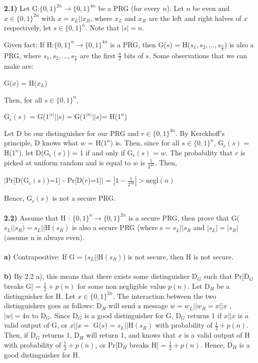 \documentclass[12pt]{article}
\begin{document}
\noindent \textbf{2.1)} Let G:$\{0,1\}^{2n} \rightarrow \{0,1\}^{4n}$ be a PRG (for every $n$). Let $n$ be even and $x \in \{0,1\}^{2n}$ with $x = x_L||x_R$, where $x_L$ and $x_R$ are the left and right halves of $x$ respectively, let $s \in \{0,1\}^n$. Note that $|s| = n$. 

\noindent Given fact: If H:$\{0,1\}^n \rightarrow \{0,1\}^{4n}$ is a PRG, then G($s$) = H($s_1, s_2,...,s_\frac{n}{2}$) is also a PRG, where $s_1, s_2,...,s_\frac{n}{2}$ are the first $\frac{n}{2}$ bits of $s$. Some observations that we can make are:
\begin{center}
G($x$) = H($x_L$)
\end{center}
\noindent Then, for all $s \in \{0,1\}^n$,
\begin{center}
G$_c(s)$ = G($1^{|s|}||s$) = G($1^{|n|}||s$)= H($1^n$)
\end{center}
\noindent Let D be our distinguisher for our PRG and $r \in \{0,1\}^{4n}$. By Kerckhoff's principle, D knows what $w$ = H($1^n$) is. Then, since for all $s \in \{0,1\}^n$, G$_c(s)$ = H($1^n$), let D(G$_c(s)$) = 1 if and only if G$_c(s)$ = $w$. The probability that $r$ is picked at uniform random and is equal to $w$ is $\frac{1}{2^{4n}}$. Then,
\begin{center}
$|$Pr[D(G$_c(s)$)=1] - Pr[D($r$)=1]$|$ = $|1 - \frac{1}{2^{4n}}| >$negl$(n)$
\end{center}
Hence, G$_c(s)$ is not a secure PRG.
\\
\\
\noindent \textbf{2.2)}  Assume that H : $\{0, 1\}^n \rightarrow \{0, 1\}^{2n}$ is a secure PRG, then prove that G($s_L||s_R) =
s_L||$H$(s_R)$ is also a secure PRG (where s = $s_L||s_R$ and $|s_L| = |s_R|$ (assume n is always even).
\\
\\
\noindent \textbf{a)} Contrapositive: If G = ($s_L || $H$(s_R)$) is not secure, then H is not secure.
\\
\\
\noindent \textbf{b)} By 2.2 a), this means that there exists some distinguisher D$_G$ such that Pr[D$_G$ breaks G] = $\frac{1}{2} + p(n)$ for some non negligible value $p(n)$. Let D$_H$ be a distinguisher for H. Let $x \in \{0, 1\}^{2n}$. The interaction between the two distinguishers goes as follows: D$_H$ will send a message $w = w_L||w_R = x||x$ , $|w| = 4n$ to D$_G$. Since D$_G$ is a good distinguisher for G, D$_G$ returns 1 if $x||x$ is a valid output of G, or $x||x =$ G($s$) = $s_L||$H$(s_R)$ with probability of $\frac{1}{2} + p(n)$. Then, if D$_G$ returns 1, D$_H$ will return 1, and knows that $x$ is a valid output of H with probability of $\frac{1}{2} + p(n)$, or Pr[D$_H$ breaks H] = $\frac{1}{2} + p(n)$. Hence, D$_H$ is a good distinguisher for H.
\end{document}
